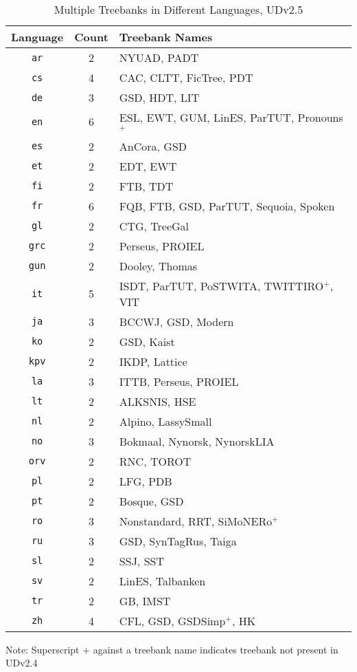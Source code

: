 \begin{table}[H]
    \centering
    \begin{tabular}{|c|c|l|}
    \hline
    \textbf{Language} & \textbf{Count} & \textbf{Treebank Names} \\
    \hline \hline
\texttt{ar} & 2 & NYUAD, PADT \\
\texttt{cs} & 4 & CAC, CLTT, FicTree, PDT \\
\texttt{de} & 3 & GSD, HDT, LIT \\
\texttt{en} & 6 & ESL, EWT, GUM, LinES, ParTUT, Pronouns\(^{+}\) \\
\texttt{es} & 2 & AnCora, GSD \\
\texttt{et} & 2 & EDT, EWT \\
\texttt{fi} & 2 & FTB, TDT \\
\texttt{fr} & 6 & FQB, FTB, GSD, ParTUT, Sequoia, Spoken \\
\texttt{gl} & 2 & CTG, TreeGal \\
\texttt{grc} & 2 & Perseus, PROIEL \\
\texttt{gun} & 2 & Dooley, Thomas \\
\texttt{it} & 5 & ISDT, ParTUT, PoSTWITA, TWITTIRO\(^{+}\), VIT \\
\texttt{ja} & 3 & BCCWJ, GSD, Modern \\
\texttt{ko} & 2 & GSD, Kaist \\
\texttt{kpv} & 2 & IKDP, Lattice \\
\texttt{la} & 3 & ITTB, Perseus, PROIEL \\
\texttt{lt} & 2 & ALKSNIS, HSE \\
\texttt{nl} & 2 & Alpino, LassySmall \\
\texttt{no} & 3 & Bokmaal, Nynorsk, NynorskLIA \\
\texttt{orv} & 2 & RNC, TOROT \\
\texttt{pl} & 2 & LFG, PDB \\
\texttt{pt} & 2 & Bosque, GSD \\
\texttt{ro} & 3 & Nonstandard, RRT, SiMoNERo\(^{+}\) \\
\texttt{ru} & 3 & GSD, SynTagRus, Taiga \\
\texttt{sl} & 2 & SSJ, SST \\
\texttt{sv} & 2 & LinES, Talbanken \\
\texttt{tr} & 2 & GB, IMST \\
\texttt{zh} & 4 & CFL, GSD, GSDSimp\(^{+}\), HK \\
    \hline
    \end{tabular}
    \caption{Multiple Treebanks in Different Languages, UDv2.5}
    Note: Superscript \(+\) against a treebank name indicates treebank not present in UDv2.4
    \label{tab:multi_trees}
\end{table}


